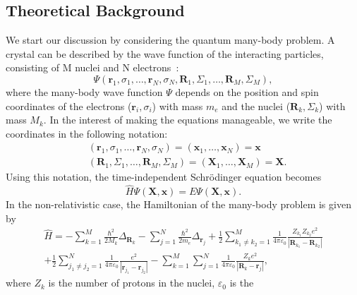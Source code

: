 \begin{refsection}
\newpage 
 
\section{Theoretical Background} \label{dft:sec-theory} 
 
We start our discussion by considering the quantum many-body problem. A 
crystal can be described by the wave function of the interacting particles, 
consisting of M nuclei and N electrons~\cite{Springborg2017}: 
\begin{equation} 
 \Psi (\mathbf{r}_1, \sigma_1, \hdots,\mathbf{r}_N, \sigma_N, \mathbf{R}_1, 
\Sigma_1, \hdots, \mathbf{R}_M, \Sigma_M), 
\end{equation} 
where the many-body wave function $\Psi$ depends on the position and spin 
coordinates of the electrons ($\mathbf{r}_i,\sigma_i$) with mass $m_e$ and the 
nuclei ($\mathbf{R}_k,\Sigma_k$) with mass $M_k$. In the interest of making 
the equations manageable, we write the coordinates in the following notation: 
\begin{eqnarray*} 
&(\mathbf{r}_1, \sigma_1, \hdots,\mathbf{r}_N, \sigma_N) = 
(\mathbf{x}_1,\hdots , \mathbf{x}_N) = \mathbf{x} 
\\&(\mathbf{R}_1, \Sigma_1, \hdots, \mathbf{R}_M, \Sigma_M) = 
(\mathbf{X}_1,\hdots , \mathbf{X}_M) = \mathbf{X}. 
\end{eqnarray*} 
Using this notation, the time-independent Schr\"odinger equation becomes 
\begin{equation} 
\hat{H} \Psi (\mathbf{X}, \mathbf{x}) = E \Psi (\mathbf{X}, \mathbf{x}). 
\end{equation} 
In the non-relativistic case, the 
Hamiltonian of the many-body problem is given by 
\begin{equation} 
\begin{gathered} 
\hat{H}=-\sum_{k=1}^M \frac{\hbar^2}{2M_k}\Delta_{\mathbf{R}_k}-\sum_{j=1}^N 
\frac{\hbar^2}{2m_e} \Delta_{\mathbf{r}_j} + \frac{1}{2} \sum_{k_1 \neq k_2 = 
1}^M \frac{1}{4 \pi \varepsilon_0} \frac{Z_{k_1} Z_{k_2} e^2 
}{|\mathbf{R}_{k_1}-\mathbf{R}_{k_2}|} \\ + \frac{1}{2} \sum_{j_1 \neq j_2 = 
1}^N \frac{1}{4 \pi \varepsilon_0} \frac{e^2 
}{|\mathbf{r}_{j_1}-\mathbf{r}_{j_2}|} - \sum_{k=1}^M \sum_{j=1}^N  \frac{1}{4 
\pi \varepsilon_0} \frac{Z_k e^2 }{|\mathbf{R}_{k}-\mathbf{r}_{j}|}, 
\end{gathered} 
\end{equation} 
where $Z_k$ is the number of protons in the nuclei, $\varepsilon_0$ is the 

\end{refsection}
